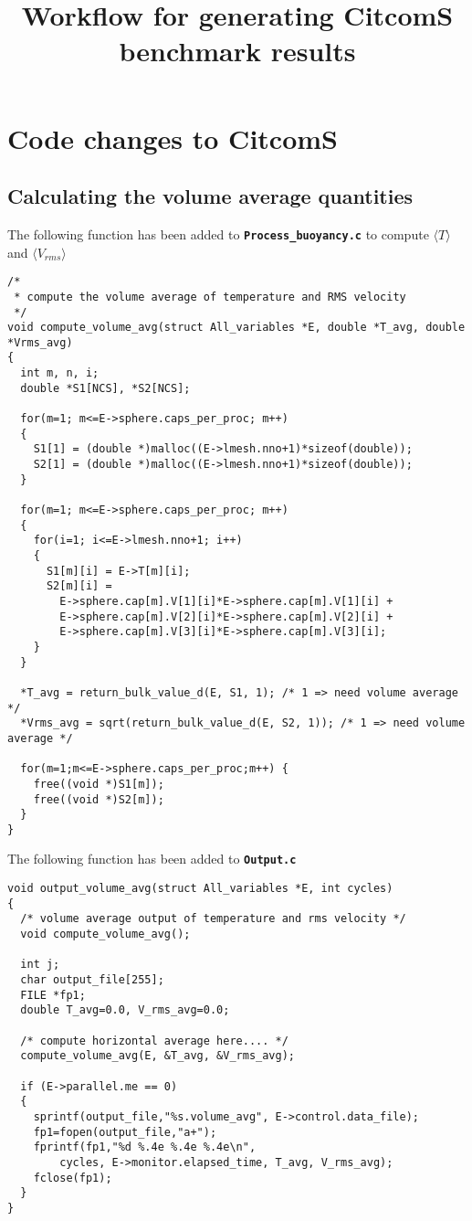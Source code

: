 \documentclass[10pt]{article}
\title{Workflow for generating CitcomS benchmark results}
\author{}
\begin{document}
\maketitle
\section*{Code changes to CitcomS}
\subsection*{Calculating the volume average quantities}
The following function has been added to \texttt{\textbf{Process\_buoyancy.c}} to compute
$\langle T\rangle$ and $\langle V_{rms}\rangle$
\begin{verbatim}
/*
 * compute the volume average of temperature and RMS velocity 
 */
void compute_volume_avg(struct All_variables *E, double *T_avg, double *Vrms_avg)
{
  int m, n, i;
  double *S1[NCS], *S2[NCS];

  for(m=1; m<=E->sphere.caps_per_proc; m++)
  {
    S1[1] = (double *)malloc((E->lmesh.nno+1)*sizeof(double));
    S2[1] = (double *)malloc((E->lmesh.nno+1)*sizeof(double));
  }

  for(m=1; m<=E->sphere.caps_per_proc; m++)
  {
    for(i=1; i<=E->lmesh.nno+1; i++)
    {
      S1[m][i] = E->T[m][i];
      S2[m][i] = 
        E->sphere.cap[m].V[1][i]*E->sphere.cap[m].V[1][i] +
        E->sphere.cap[m].V[2][i]*E->sphere.cap[m].V[2][i] +
        E->sphere.cap[m].V[3][i]*E->sphere.cap[m].V[3][i];
    }
  }
  
  *T_avg = return_bulk_value_d(E, S1, 1); /* 1 => need volume average */
  *Vrms_avg = sqrt(return_bulk_value_d(E, S2, 1)); /* 1 => need volume average */

  for(m=1;m<=E->sphere.caps_per_proc;m++) {
    free((void *)S1[m]);
    free((void *)S2[m]);
  }
}
\end{verbatim}

The following function has been added to \textbf{\texttt{Output.c}}

\begin{verbatim}
void output_volume_avg(struct All_variables *E, int cycles)
{
  /* volume average output of temperature and rms velocity */
  void compute_volume_avg();

  int j;
  char output_file[255];
  FILE *fp1;
  double T_avg=0.0, V_rms_avg=0.0;

  /* compute horizontal average here.... */
  compute_volume_avg(E, &T_avg, &V_rms_avg);

  if (E->parallel.me == 0)  
  {
    sprintf(output_file,"%s.volume_avg", E->control.data_file);
    fp1=fopen(output_file,"a+");
    fprintf(fp1,"%d %.4e %.4e %.4e\n", 
	    cycles, E->monitor.elapsed_time, T_avg, V_rms_avg);
    fclose(fp1);
  }
}
\end{verbatim}
\end{document}
